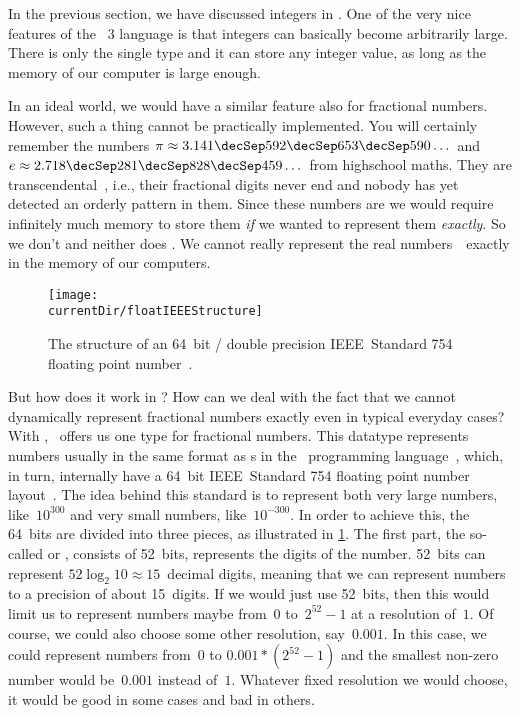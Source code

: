 %
\label{sec:floats}%
%
In the previous section, we have discussed integers in \python.
One of the very nice features of the \python~3 language is that integers can basically become arbitrarily large.
There is only the single type  and it can store any integer value, as long as the memory of our computer is large enough.%
%
\begin{sloppypar}%
In an ideal world, we would have a similar feature also for fractional numbers.
However, such a thing cannot be practically implemented.
You will certainly remember the numbers $\pi\approx3.141\decSep592\decSep653\decSep590\dots$ and $e\approx2.718\decSep281\decSep828\decSep459\dots$ from highschool maths.
They are transcendental~\cite{N1939TTOP,APM1991TOEAP,F2011TTOEAP}, i.e., their fractional digits never end and nobody has yet detected an orderly pattern in them.
Since these numbers are  we would require infinitely much memory to store them \emph{if} we wanted to represent them \emph{exactly}.
So we don't and neither does \python.
We cannot really represent the real numbers~\realNumbers\ exactly in the memory of our computers.%
\end{sloppypar}%
%
%
\label{sec:howFloatingPointNumbersWork}%
%
\begin{figure}%
\centering%
\texttt{[image: \\currentDir/floatIEEEStructure]}%
\caption{The structure of an 64~bit / double precision IEEE~Standard 754 floating point number~\cite{IEEE2019ISFFPA,H1997IS7FPN}.}%
\label{fig:floatIEEEStructure}%
\end{figure}%
%
But how does it work in \python?
How can we deal with the fact that we cannot dynamically represent fractional numbers exactly even in typical everyday cases?
With , \python\ offers us one type for fractional numbers.
This datatype represents numbers usually in the same format as s in the ~programming language~\cite{PSF2024NTIFC}, which, in turn, internally have a 64~bit IEEE~Standard 754 floating point number layout~\cite{IEEE2019ISFFPA,H1997IS7FPN}.
The idea behind this standard is to represent both very large numbers, like~$10^{300}$ and very small numbers, like~$10^{-300}$.
In order to achieve this, the 64~bits are divided into three pieces, as illustrated in \cref{fig:floatIEEEStructure}.
%
%
%
The first part, the so-called  or , consists of 52~bits, represents the digits of the number.
52~bits can represent $52\log_2 10\approx 15$~decimal digits, meaning that we can represent numbers to a precision of about 15~digits.
If we would just use 52~bits, then this would limit us to represent numbers maybe from~$0$ to~$2^{52}-1$ at a resolution of~$1$.
Of course, we could also choose some other resolution, say~$0.001$.
In this case, we could represent numbers from~$0$ to $0.001*(2^{52}-1)$ and the smallest non-zero number would be~$0.001$ instead of~$1$.
Whatever fixed resolution we would choose, it would be good in some cases and bad in others.


